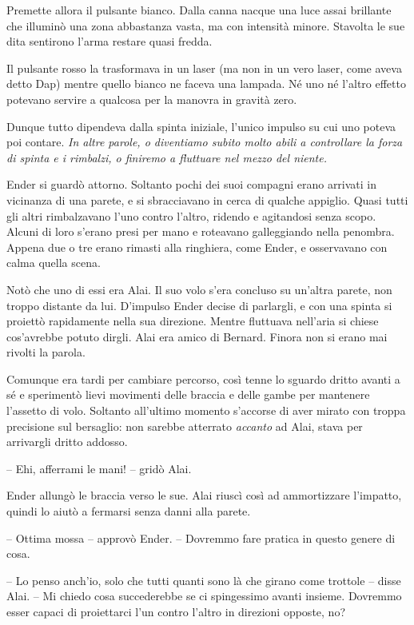 {Premette allora il pulsante bianco. Dalla canna nacque una luce assai
	brillante che illuminò una zona abbastanza vasta, ma con intensità
	minore. Stavolta le sue dita sentirono l'arma restare quasi fredda.}

{Il pulsante rosso la trasformava in un laser (ma non in un vero laser,
	come aveva detto Dap) mentre quello bianco ne faceva una lampada. Né uno
	né l'altro effetto potevano servire a qualcosa per la manovra in gravità
	zero.}

{Dunque tutto dipendeva dalla spinta iniziale, l'unico impulso su cui
	uno poteva poi contare. \emph{In altre parole, o diventiamo subito molto
		abili a controllare la forza di spinta e i rimbalzi, o finiremo a
		fluttuare nel mezzo del niente.}}

{Ender si guardò attorno. Soltanto pochi dei suoi compagni erano
	arrivati in vicinanza di una parete, e si sbracciavano in cerca di
	qualche appiglio. Quasi tutti gli altri rimbalzavano l'uno contro
	l'altro, ridendo e agitandosi senza scopo. Alcuni di loro s'erano presi
	per mano e roteavano galleggiando nella penombra. Appena due o tre erano
	rimasti alla ringhiera, come Ender, e osservavano con calma quella
	scena.}

{Notò che uno di essi era Alai. Il suo volo s'era concluso su un'altra
	parete, non troppo distante da lui. D'impulso Ender decise di parlargli,
	e con una spinta si proiettò rapidamente nella sua direzione. Mentre
	fluttuava nell'aria si chiese cos'avrebbe potuto dirgli. Alai era amico
	di Bernard. Finora non si erano mai rivolti la parola.}

{Comunque era tardi per cambiare percorso, così tenne lo sguardo dritto
	avanti a sé e sperimentò lievi movimenti delle braccia e delle gambe per
	mantenere l'assetto di volo. Soltanto all'ultimo momento s'accorse di
	aver mirato con troppa precisione sul bersaglio: non sarebbe atterrato
	\emph{accanto} ad Alai, stava per arrivargli dritto addosso.}

{-- Ehi, afferrami le mani! -- gridò Alai.}

{Ender allungò le braccia verso le sue. Alai riuscì così ad ammortizzare
	l'impatto, quindi lo aiutò a fermarsi senza danni alla parete.}

{-- Ottima mossa -- approvò Ender. -- Dovremmo fare pratica in questo
	genere di cosa.}

{-- Lo penso anch'io, solo che tutti quanti sono là che girano come
	trottole -- disse Alai. -- Mi chiedo cosa succederebbe se ci spingessimo
	avanti insieme. Dovremmo esser capaci di proiettarci l'un contro l'altro
	in direzioni opposte, no?}

